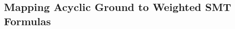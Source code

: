 































\subsection{Mapping Acyclic Ground \dcproblogsty to Weighted SMT Formulas}

